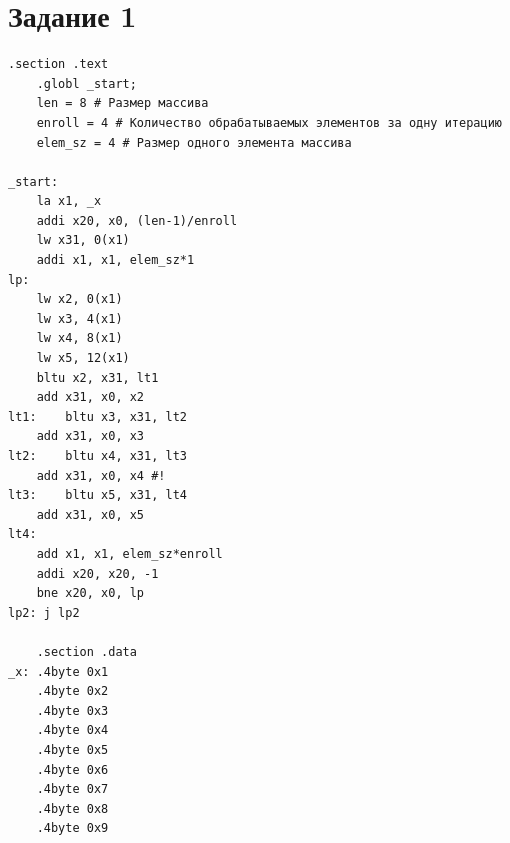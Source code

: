 \section{Задание 1}

\begin{lstlisting}[label={common_asm}, caption=Исходный текст программы для варианта 21]
    .section .text
    .globl _start;
    len = 8 # Размер массива
    enroll = 4 # Количество обрабатываемых элементов за одну итерацию
    elem_sz = 4 # Размер одного элемента массива

_start:
    la x1, _x
    addi x20, x0, (len-1)/enroll
    lw x31, 0(x1)
    addi x1, x1, elem_sz*1
lp:
    lw x2, 0(x1)
    lw x3, 4(x1)
    lw x4, 8(x1)
    lw x5, 12(x1)
    bltu x2, x31, lt1
    add x31, x0, x2
lt1:    bltu x3, x31, lt2
    add x31, x0, x3
lt2:    bltu x4, x31, lt3
    add x31, x0, x4 #!
lt3:    bltu x5, x31, lt4
    add x31, x0, x5
lt4:
    add x1, x1, elem_sz*enroll
    addi x20, x20, -1
    bne x20, x0, lp
lp2: j lp2

    .section .data
_x: .4byte 0x1
    .4byte 0x2
    .4byte 0x3
    .4byte 0x4
    .4byte 0x5
    .4byte 0x6
    .4byte 0x7
    .4byte 0x8
    .4byte 0x9

\end{lstlisting}

